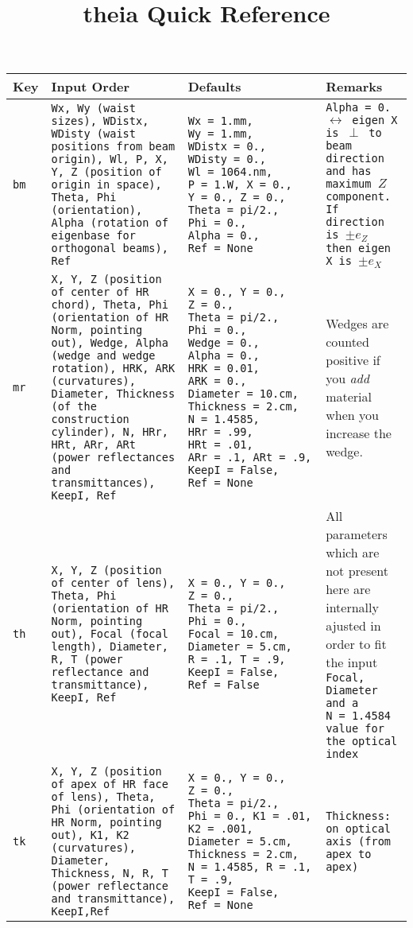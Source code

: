 \documentclass[a4paper, landscape]{article}
\title{theia Quick Reference}
\begin{document}
\begin{tabular}{| p{.6cm} | p{7cm}| p{6cm} | p{5cm} |}
\hline
\textbf{Key} & \textbf{Input Order} & \textbf{Defaults} & \textbf{Remarks} \\ \hline \hline

\tt{bm} & \tt{Wx}, \tt{Wy} (waist sizes), \tt{WDistx}, \tt{WDisty} (waist positions from beam origin), \tt{Wl}, \tt{P}, \tt{X}, \tt{Y}, \tt{Z} (position of origin in space), \tt{Theta}, \tt{Phi} (orientation), \tt{Alpha} (rotation of eigenbase for orthogonal beams), \tt{Ref}  & \tt{Wx}~=~1.mm, \tt{Wy}~=~1.mm, \tt{WDistx}~=~0., \tt{WDisty}~=~0., \tt{Wl}~=~1064.nm, \tt{P}~=~1.W, \tt{X}~=~0., \tt{Y}~=~0., \tt{Z}~=~0., \tt{Theta}~=~pi/2., \tt{Phi}~=~0., \tt{Alpha}~=~0., \tt{Ref}~=~None & \tt{Alpha = 0.} $\leftrightarrow$ eigen X is $\perp$ to beam direction and has maximum $Z$ component. If direction is $\pm e_Z$ then eigen X is $\pm e_X$\\ \hline

\tt{mr} & \tt{X}, \tt{Y}, \tt{Z} (position of center of HR chord), \tt{Theta}, \tt{Phi} (orientation of HR Norm, pointing out), \tt{Wedge}, \tt{Alpha} (wedge and wedge rotation), \tt{HRK}, \tt{ARK} (curvatures), \tt{Diameter}, \tt{Thickness} (of the construction cylinder), \tt{N}, \tt{HRr}, \tt{HRt}, \tt{ARr}, \tt{ARt} (power reflectances and transmittances), \tt{KeepI},  \tt{Ref} & \tt{X}~=~0., \tt{Y}~=~0., \tt{Z}~=~0., \tt{Theta}~=~pi/2., \tt{Phi}~=~0., \tt{Wedge}~=~0., \tt{Alpha}~=~0., \tt{HRK}~=~0.01, \tt{ARK}~=~0., \tt{Diameter}~=~10.cm, \tt{Thickness}~=~2.cm, \tt{N}~=~1.4585, \tt{HRr}~=~.99, \tt{HRt}~=~.01, \tt{ARr}~=~.1, \tt{ARt}~=~.9, \tt{KeepI}~=~False, \tt{Ref}~=~None & Wedges are counted positive if you \textit{add} material when you increase the wedge.\\ \hline

\tt{th} & \tt{X}, \tt{Y}, \tt{Z} (position of center of lens), \tt{Theta}, \tt{Phi} (orientation of HR Norm, pointing out), \tt{Focal} (focal length),  \tt{Diameter}, \tt{R}, \tt{T} (power reflectance and transmittance), \tt{KeepI}, \tt{Ref} & \tt{X}~=~0., \tt{Y}~=~0., \tt{Z}~=~0., \tt{Theta}~=~pi/2., \tt{Phi}~=~0., \tt{Focal}~=~10.cm,  \tt{Diameter}~=~5.cm, \tt{R}~=~.1, \tt{T}~=~.9, \tt{KeepI}~=~False,  \tt{Ref}~=~False & All parameters which are not present here are internally ajusted in order to fit the input \tt{Focal}, \tt{Diameter} and a \tt{N}~=~1.4584 value for the optical index\\ \hline

\tt{tk} & \tt{X}, \tt{Y}, \tt{Z} (position of apex of HR face of lens), \tt{Theta}, \tt{Phi} (orientation of HR Norm, pointing out), \tt{K1}, \tt{K2} (curvatures), \tt{Diameter},  \tt{Thickness}, \tt{N}, \tt{R}, \tt{T} (power reflectance and transmittance), \tt{KeepI},\tt{Ref} & \tt{X}~=~0., \tt{Y}~=~0., \tt{Z}~=~0., \tt{Theta}~=~pi/2., \tt{Phi}~=~0., \tt{K1}~=~.01, \tt{K2}~=~.001, \tt{Diameter}~=~5.cm,  \tt{Thickness}~=~2.cm, \tt{N}~=~1.4585, \tt{R}~=~.1, \tt{T}~=~.9, \tt{KeepI}~=~False,  \tt{Ref}~=~None & \tt{Thickness}: on optical axis (from apex to apex) \\ \hline


\end{tabular}
\end{document}
